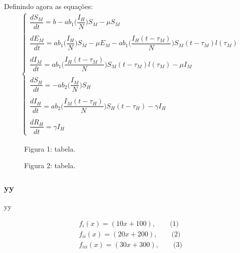 \documentclass[12pt]{article}
\begin{document}
Definindo agora as equações:
\begin{gather*}
\begin{cases}
\dfrac{dS_M}{dt} = b - ab_1\bigg(\dfrac{I_H}{N}\bigg)S_M - \mu S_M\\
\\
\dfrac{dE_M}{dt} = ab_1\bigg(\dfrac{I_H}{N}\bigg)S_M - \mu E_M - ab_1\bigg(\dfrac{I_H(t-\tau_M)}{N}\bigg)S_M(t-\tau_M)l(\tau_M)\\
\\
\dfrac{dI_M}{dt} = ab_1\bigg(\dfrac{I_H(t-\tau_M)}{N}\bigg)S_M(t-\tau_M)l(\tau_M) -\mu I_M\\
\\
\dfrac{dS_H}{dt} = -ab_2\bigg(\dfrac{I_M}{N}\bigg)S_H\\
\\
\dfrac{dI_H}{dt} = ab_2\bigg(\dfrac{I_M(t-\tau_H)}{N}\bigg)S_H(t-\tau_H)-\gamma I_H\\
\\
\dfrac{dR_H}{dt} = \gamma I_H
\end{cases}
\end{gather*}


\newpage
\begin{figure}[H]
\centering
\begin{center}
Figura 1: tabela.
\end{center}
\end{figure}

\begin{figure}[H]
\centering
\begin{center}
Figura 2: tabela.
\end{center}
\end{figure}

\newpage
\subsubsection{yy}

yy

\begin{align*}
f_{i}(x) = (10x + 100), \qquad \text{(1)} \tag{1}\\
f_{ii}(x) = (20x + 200), \qquad \text{(2)} \tag{2} \\
f_{iii}(x) = (30x + 300), \qquad \text{(3)} \tag{3} \\
\end{align*} %
\end{document}
